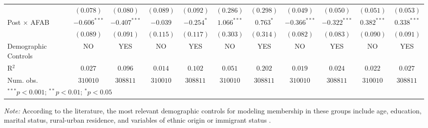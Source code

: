 \begin{table}[htpb]
{\begin{tabular}{l c c c c c c c c c c}
                     & $(0.078)$      & $(0.080)$      & $(0.089)$      & $(0.092)$      & $(0.286)$     & $(0.298)$    & $(0.049)$      & $(0.050)$      & $(0.051)$      & $(0.053)$      \\
Post $\times$ AFAB   & $-0.606^{***}$ & $-0.407^{***}$ & $-0.039$       & $-0.254^{*}$   & $1.066^{***}$ & $0.763^{*}$  & $-0.366^{***}$ & $-0.322^{***}$ & $0.382^{***}$  & $0.338^{***}$  \\
                     & $(0.089)$      & $(0.091)$      & $(0.115)$      & $(0.117)$      & $(0.303)$     & $(0.314)$    & $(0.082)$      & $(0.083)$      & $(0.090)$      & $(0.091)$      \\
\hline
Demographic Controls & NO             & YES            & NO             & YES            & NO            & YES          & NO             & YES            & NO             & YES            \\
R$^2$                & $0.027$        & $0.096$        & $0.014$        & $0.102$        & $0.051$       & $0.202$      & $0.019$        & $0.024$        & $0.022$        & $0.027$        \\
Num. obs.            & $310010$       & $308811$       & $310010$       & $308811$       & $310010$      & $308811$     & $310010$       & $308811$       & $310010$       & $308811$       \\
\hline
\multicolumn{11}{l}{\scriptsize{$^{***}p<0.001$; $^{**}p<0.01$; $^{*}p<0.05$}}
\hline
\multicolumn{11}{l}{\scriptsize{$^{***}p<0.001$; $^{**}p<0.01$; $^{*}p<0.05$}} \\
\end{tabular}
}
\vspace{1ex}
\raggedright
\footnotesize\textit{Note:} According to the literature, the most relevant demographic controls for modeling membership in these groups include age, education, marital status, rural-urban residence, and variables of ethnic origin or immigrant status \citep{Badgettetal2021, Carpenteretal2020}.
\end{table}
